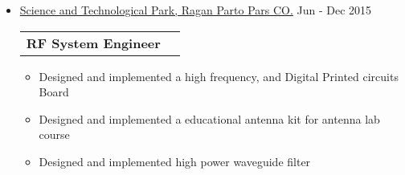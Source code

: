 \documentclass[a4paper,10pt]{article} %
\begin{document}
\begin{itemize}
\begin{itemize}
\begin{itemize}
	 	\end{itemize}
	 	
	 	\item 
	 	\href{http://www.raganparto.com/Pos.html}{Science and Technological Park, Ragan Parto Pars CO.} \hfill Jun - Dec 2015 \\
	 	\begin{tabular}{lr}
	 		{\bf RF System Engineer}& \\
	 	\end{tabular}
	 	\begin{itemize} 	
	 		\item
	 		Designed and implemented a high frequency, and Digital Printed circuits Board  
	 		\item
	 		Designed and implemented a educational antenna kit for antenna lab course 
	 			\item
	 			Designed and implemented high power waveguide filter   \\
	 	\end{itemize}
	 	
	 \end{itemize}
\end{itemize}
\end{document}
